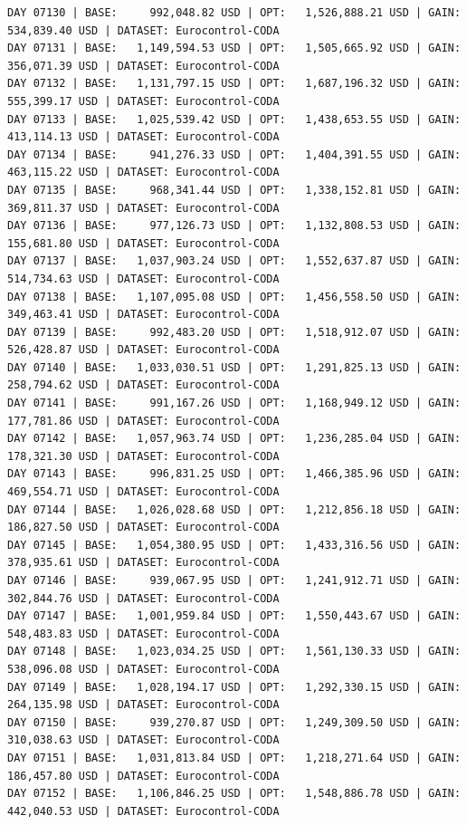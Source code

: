 \documentclass[11pt,a4paper]{article}
\begin{document}
\begin{verbatim}
DAY 07130 | BASE:     992,048.82 USD | OPT:   1,526,888.21 USD | GAIN: 534,839.40 USD | DATASET: Eurocontrol-CODA
DAY 07131 | BASE:   1,149,594.53 USD | OPT:   1,505,665.92 USD | GAIN: 356,071.39 USD | DATASET: Eurocontrol-CODA
DAY 07132 | BASE:   1,131,797.15 USD | OPT:   1,687,196.32 USD | GAIN: 555,399.17 USD | DATASET: Eurocontrol-CODA
DAY 07133 | BASE:   1,025,539.42 USD | OPT:   1,438,653.55 USD | GAIN: 413,114.13 USD | DATASET: Eurocontrol-CODA
DAY 07134 | BASE:     941,276.33 USD | OPT:   1,404,391.55 USD | GAIN: 463,115.22 USD | DATASET: Eurocontrol-CODA
DAY 07135 | BASE:     968,341.44 USD | OPT:   1,338,152.81 USD | GAIN: 369,811.37 USD | DATASET: Eurocontrol-CODA
DAY 07136 | BASE:     977,126.73 USD | OPT:   1,132,808.53 USD | GAIN: 155,681.80 USD | DATASET: Eurocontrol-CODA
DAY 07137 | BASE:   1,037,903.24 USD | OPT:   1,552,637.87 USD | GAIN: 514,734.63 USD | DATASET: Eurocontrol-CODA
DAY 07138 | BASE:   1,107,095.08 USD | OPT:   1,456,558.50 USD | GAIN: 349,463.41 USD | DATASET: Eurocontrol-CODA
DAY 07139 | BASE:     992,483.20 USD | OPT:   1,518,912.07 USD | GAIN: 526,428.87 USD | DATASET: Eurocontrol-CODA
DAY 07140 | BASE:   1,033,030.51 USD | OPT:   1,291,825.13 USD | GAIN: 258,794.62 USD | DATASET: Eurocontrol-CODA
DAY 07141 | BASE:     991,167.26 USD | OPT:   1,168,949.12 USD | GAIN: 177,781.86 USD | DATASET: Eurocontrol-CODA
DAY 07142 | BASE:   1,057,963.74 USD | OPT:   1,236,285.04 USD | GAIN: 178,321.30 USD | DATASET: Eurocontrol-CODA
DAY 07143 | BASE:     996,831.25 USD | OPT:   1,466,385.96 USD | GAIN: 469,554.71 USD | DATASET: Eurocontrol-CODA
DAY 07144 | BASE:   1,026,028.68 USD | OPT:   1,212,856.18 USD | GAIN: 186,827.50 USD | DATASET: Eurocontrol-CODA
DAY 07145 | BASE:   1,054,380.95 USD | OPT:   1,433,316.56 USD | GAIN: 378,935.61 USD | DATASET: Eurocontrol-CODA
DAY 07146 | BASE:     939,067.95 USD | OPT:   1,241,912.71 USD | GAIN: 302,844.76 USD | DATASET: Eurocontrol-CODA
DAY 07147 | BASE:   1,001,959.84 USD | OPT:   1,550,443.67 USD | GAIN: 548,483.83 USD | DATASET: Eurocontrol-CODA
DAY 07148 | BASE:   1,023,034.25 USD | OPT:   1,561,130.33 USD | GAIN: 538,096.08 USD | DATASET: Eurocontrol-CODA
DAY 07149 | BASE:   1,028,194.17 USD | OPT:   1,292,330.15 USD | GAIN: 264,135.98 USD | DATASET: Eurocontrol-CODA
DAY 07150 | BASE:     939,270.87 USD | OPT:   1,249,309.50 USD | GAIN: 310,038.63 USD | DATASET: Eurocontrol-CODA
DAY 07151 | BASE:   1,031,813.84 USD | OPT:   1,218,271.64 USD | GAIN: 186,457.80 USD | DATASET: Eurocontrol-CODA
DAY 07152 | BASE:   1,106,846.25 USD | OPT:   1,548,886.78 USD | GAIN: 442,040.53 USD | DATASET: Eurocontrol-CODA

\end{verbatim}
\end{document}
